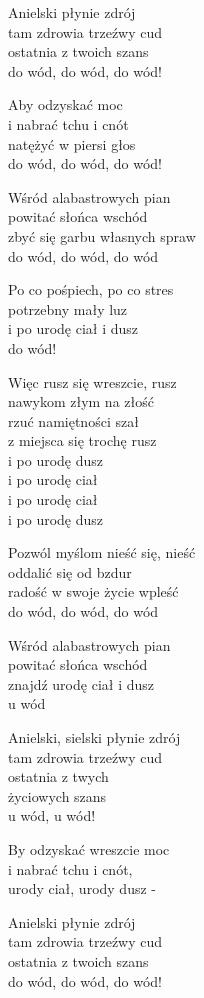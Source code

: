 \begin{text}
    Anielski płynie zdrój\\
    tam zdrowia trzeźwy cud\\
    ostatnia z twoich szans\\
    do wód, do wód, do wód!

    Aby odzyskać moc\\
    i nabrać tchu i cnót\\
    natężyć w piersi głos\\
    do wód, do wód, do wód!

    Wśród alabastrowych pian\\
    powitać słońca wschód\\
    zbyć się garbu własnych spraw\\
    do wód, do wód, do wód

    Po co pośpiech, po co stres\\
    potrzebny mały luz\\
    i po urodę ciał i dusz\\
    do wód!

    Więc rusz się wreszcie, rusz\\
    nawykom złym na złość\\
    rzuć namiętności szał\\
    z miejsca się trochę rusz\\
    i po urodę dusz\\
    i po urodę ciał\\
    i po urodę ciał\\
    i po urodę dusz

    Pozwól myślom nieść się, nieść\\
    oddalić się od bzdur\\
    radość w swoje życie wpleść\\
    do wód, do wód, do wód

    Wśród alabastrowych pian\\
    powitać słońca wschód\\
    znajdź urodę ciał i dusz\\
    u wód

    Anielski, sielski płynie zdrój\\
    tam zdrowia trzeźwy cud\\
    ostatnia z twych\\
    życiowych szans\\
    u wód, u wód!

    By odzyskać wreszcie moc\\
    i nabrać tchu i cnót,\\
    urody ciał, urody dusz -

    Anielski płynie zdrój\\
    tam zdrowia trzeźwy cud\\
    ostatnia z twoich szans\\
    do wód, do wód, do wód!
\end{text}
\begin{chord}

\end{chord}